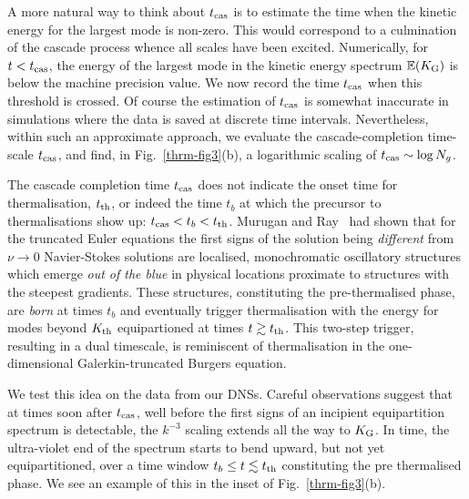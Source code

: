 \documentclass[../Rajarshi-thesis-draft.tex]{subfiles}
\begin{document}
A more natural way to think about $t_{\rm cas}$ is to estimate the time when the kinetic
energy for the largest mode is non-zero. This would correspond to a
culmination of the cascade process whence all scales have been excited.
Numerically, for $t < t_{\rm cas}$, the energy of the largest mode in the kinetic
energy spectrum $\mathbb{E}(K_{\rm G})$ is below the machine precision value. We now
record the time $t_{\rm cas}$ when this threshold is crossed. Of course the estimation of $t_{\rm cas}$
is somewhat inaccurate in simulations where the data is saved at discrete time intervals. Nevertheless, within such an approximate approach, we evaluate the
cascade-completion time-scale $t_{\rm cas}$, and find, in Fig.~\ref{thrm-fig3}(b), a
logarithmic scaling of $t_{\rm cas} \sim \log N_g$.

The cascade completion time $t_{\rm cas}$ does not indicate the onset time for thermalisation, $t_{\rm th}$, or indeed the time $t_b$ at which the precursor to thermalisations show up:
$t_{\rm cas} < t_b < t_{\rm th}$.  Murugan and Ray~\cite{MuruganRay2023} had shown that
for the truncated Euler equations the first signs of the solution being
\textit{different} from $\nu \to 0$ Navier-Stokes solutions are localised,
monochromatic oscillatory structures which emerge \textit{out of the blue} in
physical locations proximate to structures with the steepest gradients. These
structures, constituting the pre-thermalised phase, are \textit{born} at times $t_b$ and eventually trigger
thermalisation with the energy for modes beyond $K_{\rm th}$
equipartioned at times $t \gtrsim t_{\rm th}$. This two-step trigger, resulting in a dual timescale,
is reminiscent of thermalisation
in the one-dimensional Galerkin-truncated Burgers equation.

We test this idea on the data from our DNSs. Careful observations suggest that
at times soon after $t_{\rm cas}$, well before the first signs of an incipient
equipartition spectrum is detectable, the $k^{-3}$ scaling extends all the way
to $K_{\rm G}$. In time, the ultra-violet end of the spectrum starts to bend
upward, but not yet equipartitioned, over a time window $t_b \leq t \lesssim
t_{\rm th}$ constituting the pre thermalised phase.  We see an example of this
in the inset of Fig.~\ref{thrm-fig3}(b).
\end{document}
